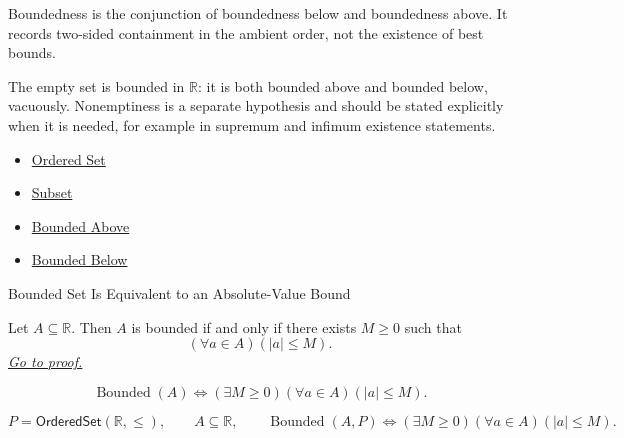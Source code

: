 \begin{remark*}[Interpretation]
Boundedness is the conjunction of boundedness below and boundedness above.
It records two-sided containment in the ambient order, not the existence of
best bounds.
\end{remark*}

\begin{remark*}[Exposition]
The empty set is bounded in $\mathbb{R}$: it is both bounded above and
bounded below, vacuously.  Nonemptiness is a separate hypothesis and should be
stated explicitly when it is needed, for example in supremum and infimum
existence statements.
\end{remark*}

\begin{dependencies}
\begin{itemize}
  \item \hyperref[def:ordered-set]{Ordered Set}
  \item \hyperref[def:subset]{Subset}
  \item \hyperref[def:bounded-above]{Bounded Above}
  \item \hyperref[def:bounded-below]{Bounded Below}
\end{itemize}
\end{dependencies}


\begin{propositionbox}{Bounded Set Is Equivalent to an Absolute-Value Bound}
\begin{proposition}
\label{prop:bounded-iff-absolute-value-bound}
Let $A\subseteq\mathbb{R}$. Then $A$ is bounded if and only if there exists
$M\geq 0$ such that
\[
  (\forall a\in A)(|a|\leq M).
\]
\hyperref[prf:bounded-iff-absolute-value-bound]{\textit{Go to proof.}}
\end{proposition}
\end{propositionbox}

\begin{remark*}
\[
  \operatorname{Bounded}(A)
  \Longleftrightarrow
  (\exists M\geq 0)(\forall a\in A)(|a|\leq M).
\]
\end{remark*}

\begin{remark*}
\[
  P=\mathsf{OrderedSet}(\mathbb{R},\leq),\qquad A\subseteq\mathbb{R},\qquad
  \operatorname{Bounded}(A,P)
  \Longleftrightarrow
  (\exists M\geq 0)(\forall a\in A)(|a|\leq M).
\]
\end{remark*}

